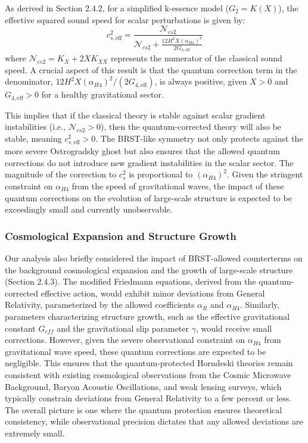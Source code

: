 \documentclass[twocolumn]{aastex631}
\begin{document}
As derived in Section 2.4.2, for a simplified k-essence model ($G_2=K(X)$), the effective squared sound speed for scalar perturbations is given by:
\begin{equation}
c_{s, \text{eff}}^2 = \frac{\mathcal{N}_{cs2}}{\mathcal{N}_{cs2} + \frac{12 H^2 X (\alpha_{H4})^2}{2 G_{4, \text{eff}}}}
\label{eq:cs_squared_effective}
\end{equation}
where $\mathcal{N}_{cs2} = K_X + 2XK_{XX}$ represents the numerator of the classical sound speed. A crucial aspect of this result is that the quantum correction term in the denominator, $12 H^2 X (\alpha_{H4})^2 / (2 G_{4, \text{eff}})$, is always positive, given $X>0$ and $G_{4, \text{eff}}>0$ for a healthy gravitational sector.

This implies that if the classical theory is stable against scalar gradient instabilities (i.e., $\mathcal{N}_{cs2} > 0$), then the quantum-corrected theory will also be stable, meaning $c_{s, \text{eff}}^2 > 0$. The BRST-like symmetry not only protects against the more severe Ostrogradsky ghost but also ensures that the allowed quantum corrections do not introduce new gradient instabilities in the scalar sector. The magnitude of the correction to $c_s^2$ is proportional to $(\alpha_{H4})^2$. Given the stringent constraint on $\alpha_{H4}$ from the speed of gravitational waves, the impact of these quantum corrections on the evolution of large-scale structure is expected to be exceedingly small and currently unobservable.

\subsubsection{Cosmological Expansion and Structure Growth}
Our analysis also briefly considered the impact of BRST-allowed counterterms on the background cosmological expansion and the growth of large-scale structure (Section 2.4.3). The modified Friedmann equations, derived from the quantum-corrected effective action, would exhibit minor deviations from General Relativity, parameterized by the allowed coefficients $\alpha_R$ and $\alpha_{H4}$. Similarly, parameters characterizing structure growth, such as the effective gravitational constant $G_{eff}$ and the gravitational slip parameter $\gamma$, would receive small corrections. However, given the severe observational constraint on $\alpha_{H4}$ from gravitational wave speed, these quantum corrections are expected to be negligible. This ensures that the quantum-protected Horndeski theories remain consistent with existing cosmological observations from the Cosmic Microwave Background, Baryon Acoustic Oscillations, and weak lensing surveys, which typically constrain deviations from General Relativity to a few percent or less. The overall picture is one where the quantum protection ensures theoretical consistency, while observational precision dictates that any allowed deviations are extremely small.
\end{document}
